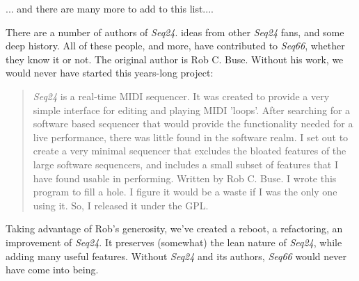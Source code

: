    ... and there are many more to add to this list....

   There are a number of authors of \textsl{Seq24}.
   ideas from other \textsl{Seq24} fans,
   and some deep history.
   All of these people, and more, have contributed to \textsl{Seq66},
   whether they know it or not.
   The original author is Rob C. Buse.
   Without his work, we would never have started this years-long project:

   \begin{quotation}
      \textsl{Seq24} is a real-time MIDI sequencer. It was created to
      provide a very simple interface for editing and playing MIDI 'loops'.
      After searching for a software based sequencer that would provide the
      functionality needed for a live performance, there was little found in
      the software realm. I set out to create a very minimal sequencer that
      excludes the bloated features of the large software sequencers, and
      includes a small subset of features that I have found usable in
      performing.  Written by Rob C. Buse.  I wrote this program to fill a
      hole.  I figure it would be a waste if I was the only one using it.  So,
      I released it under the GPL.
   \end{quotation}

   Taking advantage of Rob's generosity,
   we've created a reboot, a refactoring, an improvement of
   \textsl{Seq24}.  It preserves (somewhat) the lean nature of \textsl{Seq24},
   while adding many useful features.
   Without \textsl{Seq24} and its authors,
   \textsl{Seq66} would never have come into being.

